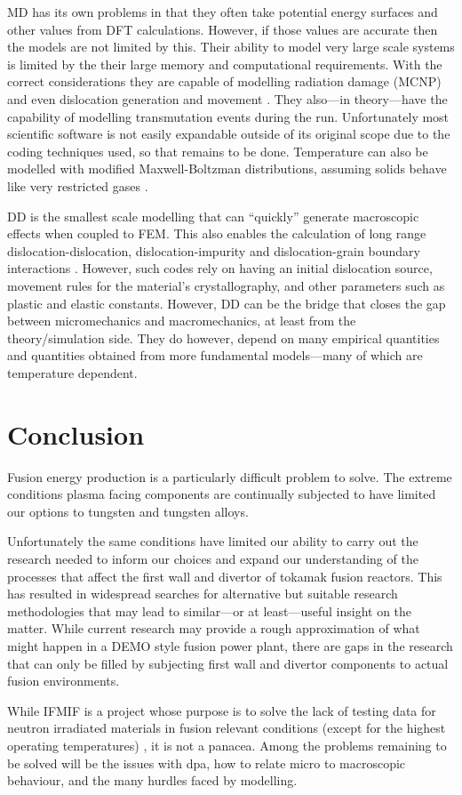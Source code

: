 \documentclass[12pt, a4paper]{article}
\begin{document}
		MD has its own problems in that they often take potential energy surfaces and other values from DFT calculations. However, if those values are accurate then the models are not limited by this. Their ability to model very large scale systems is limited by the their large memory and computational requirements. With the correct considerations they are capable of modelling radiation damage (MCNP)\cite{mcnp} and even dislocation generation and movement \cite{mddis}. They also---in theory---have the capability of modelling transmutation events during the run. Unfortunately most scientific software is not easily expandable outside of its original scope due to the coding techniques used, so that remains to be done. Temperature can also be modelled with modified Maxwell-Boltzman distributions, assuming solids behave like very restricted gases \cite{mxbmd}.
		
		DD is the smallest scale modelling that can ``quickly'' generate macroscopic effects when coupled to FEM. This also enables the calculation of long range dislocation-dislocation, dislocation-impurity and dislocation-grain boundary interactions \cite{dd}. However, such codes rely on having an initial dislocation source, movement rules for the material's crystallography, and other parameters such as plastic and elastic constants. However, DD can be the bridge that closes the gap between micromechanics and macromechanics, at least from the theory/simulation side. They do however, depend on many empirical quantities and quantities obtained from more fundamental models---many of which are temperature dependent.
	\section{Conclusion}
		Fusion energy production is a particularly difficult problem to solve. The extreme conditions plasma facing components are continually subjected to have limited our options to tungsten and tungsten alloys.
		
		Unfortunately the same conditions have limited our ability to carry out the research needed to inform our choices and expand our understanding of the processes that affect the first wall and divertor of tokamak fusion reactors. This has resulted in widespread searches for alternative but suitable research methodologies that may lead to similar---or at least---useful insight on the matter. While current research may provide a rough approximation of what might happen in a DEMO style fusion power plant, there are gaps in the research that can only be filled by subjecting first wall and divertor components to actual fusion environments.
		
		While IFMIF is a project whose purpose is to solve the lack of testing data for neutron irradiated materials in fusion relevant conditions (except for the highest operating temperatures) \cite{ifmif}, it is not a panacea. Among the problems remaining to be solved will be the issues with dpa, how to relate micro to macroscopic behaviour, and the many hurdles faced by modelling.
	
	\singlespacing
		
	
\end{document}
